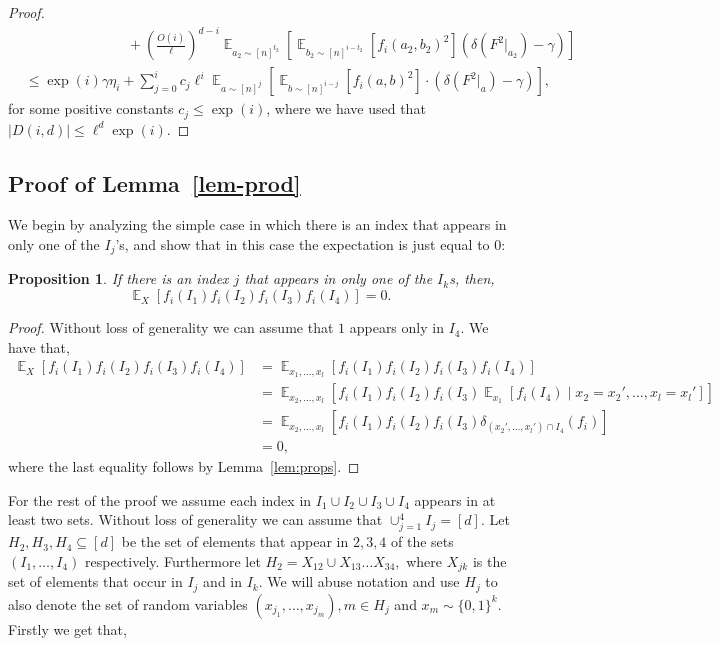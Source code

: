 \documentclass[11pt]{article}
\DeclareMathOperator*{\E}{\mathbb{E}}
\newcommand{\dor}[1]{}
\newcommand{\mitali}[1]{}
\newtheorem{proposition}[theorem]{Proposition}
\theoremstyle{definition}
\begin{document}
\begin{proof}
\begin{align*}
& ~~~~~~~~~~~~~~~~~~~~~~~~~~~~~~~~~+\left(\frac{O(i)}{\ell}\right)^{d-i}\E_{a_2 \sim [n]^{t_2}}[\E_{b_2 \sim [n]^{i-t_2}}[f_i(a_2,b_2)^2](\delta(F^{ 2}|_{a_2}) - \gamma)] \\
&\leq \exp(i)\gamma \eta_i + \sum_{j = 0}^i c_j \ell^{i}\E_{a \sim [n]^{j}}[\E_{b \sim [n]^{i - j}}[f_i(a,b)^2]\cdot (\delta(F^{ 2}|_a) - \gamma)],  
\end{align*}
for some positive constants $c_j \leq \exp(i)$, where we have used that $|D(i,d)| \leq \ell^d \exp(i)$.
\end{proof}

\subsection{Proof of Lemma~\ref{lem-prod}}\label{sec:pf_lem-prod}
We begin by analyzing the simple case in which there is an index that appears in only one of the $I_j$'s, 
and show that in this case the expectation is just equal to $0$:
\begin{proposition}
If there is an index $j$ that appears in only one of the $I_k$s, then,
$$\E_X[ f_i(I_1) f_i(I_2) f_i(I_3) f_i(I_4)] = 0.$$
\end{proposition}

\begin{proof}
Without loss of generality we can assume that $1$ appears only in $I_4$. We have that,
\begin{align*}
\E_X[ f_i(I_1) f_i(I_2) f_i(I_3) f_i(I_4)] &= \E_{x_1,\ldots,x_l}[ f_i(I_1) f_i(I_2) f_i(I_3) f_i(I_4)] \\
&= \E_{x_2,\ldots,x_l}[f_i(I_1) f_i(I_2) f_i(I_3) \E_{x_1}[f_i(I_4) \mid x_2 = x_2',\ldots, x_l = x_l']]\\
&= \E_{x_2,\ldots,x_l}[f_i(I_1) f_i(I_2) f_i(I_3) \delta_{(x_2',\ldots,x_l') \cap I_4}(f_i)] \\
&= 0,
\end{align*}
where the last equality follows by Lemma~\ref{lem:props}. 
\end{proof}
For the rest of the proof we assume each index in $I_1\cup I_2\cup I_3\cup I_4$ appears in at least two sets. Without loss of generality we can assume that $\cup_{j = 1}^4 I_j = [d]$. Let $H_2, H_3, H_4 \subseteq [d]$ be the set of elements that appear in $2,3,4$ of the sets $(I_1,\ldots,I_4)$ respectively. Furthermore let $H_2 = X_{12} \cup X_{13} \ldots X_{34},$ where $X_{jk}$ is the set of elements that occur in $I_j$ and in $I_k$. We will abuse notation and use $H_j$ to also denote the set of random variables $(x_{j_1},\ldots, x_{j_m}), m \in H_j$ and $x_m \sim \{0,1\}^k$. Firstly we get that, 
\end{document}
